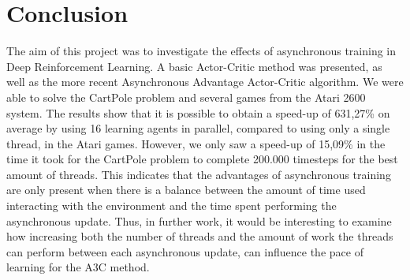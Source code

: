 \documentclass[11pt]{article}
\begin{document}
\section{Conclusion}

The aim of this project was to investigate the effects of asynchronous
training in Deep Reinforcement Learning.
A basic Actor-Critic method was presented,
as well as the more recent Asynchronous Advantage Actor-Critic algorithm.
We were able to solve the CartPole problem and several games from the
Atari 2600 system.
The results show that it is possible to obtain a
speed-up of 631,27\% on average by using 16 learning agents in parallel, compared to
using only a single thread, in the Atari games.
However, we only saw a speed-up of 15,09\% in the time it took for the CartPole problem
to complete 200.000 timesteps for the best amount of threads.
This indicates that the advantages of asynchronous training are only present when
there is a balance between the amount of time used interacting with the environment
and the time spent performing the asynchronous update.
Thus, in further work, it would be interesting to examine how increasing
both the number of threads and the amount of work the threads can perform between each
asynchronous update, can influence the pace of learning for the A3C method.
\end{document}

